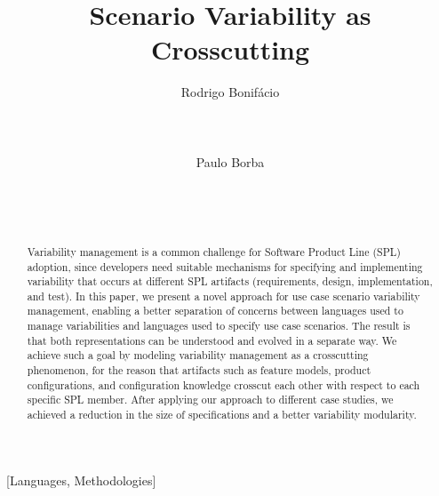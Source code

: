 \documentclass{acm_proc_article-sp}
\begin{document}
\lstset{language=Haskell, numbers=left,
numberstyle=\tiny,numbersep=5pt,basicstyle=\scriptsize,aboveskip=20pt}

\title{Scenario Variability as Crosscutting}



\author{
\alignauthor
Rodrigo Bonif\'{a}cio\\
       \\
       \\
       \\
\alignauthor
Paulo Borba\\
       \\
       \\
       \\
}

\maketitle

\begin{abstract}
Variability management is a common challenge for Software Product
Line (SPL) adoption, since developers need suitable
mechanisms for specifying and implementing variability
that occurs at different SPL artifacts (requirements, design,
implementation, and test). In this paper, we present a novel approach for
use case scenario variability management, enabling a better
separation of concerns between languages used to manage
variabilities and languages used to specify use case scenarios. The
result is that both representations can be understood and evolved in
a separate way. We achieve such a goal by modeling variability management
as a crosscutting phenomenon, for the reason that artifacts such as feature models,
product configurations, and configuration knowledge crosscut each
other with respect to each specific SPL member. After applying our approach to
different case studies, we achieved a reduction in the size of specifications
and a better variability modularity.
\end{abstract}

[Languages,
Methodologies]\

\end{document}
